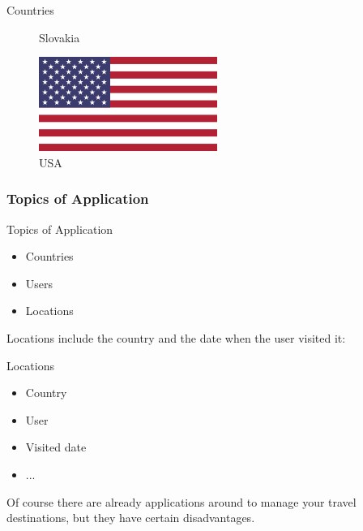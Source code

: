 \begin{frame}{Countries}
\begin{figure}[!ht]
\begin{minipage}{.24\textwidth}
\caption{Slovakia}
\end{minipage}
\begin{minipage}{.24\textwidth}
\centering
\includegraphics[width=0.8\linewidth]{img/countries/usa.png}
\caption{USA}
\end{minipage}

\end{figure}

\end{frame}

\subsubsection{Topics of Application}

\begin{frame}{Topics of Application}
\begin{itemize}
\item Countries
\item Users
\item Locations
\end{itemize}
\end{frame}

Locations include the country and the date when the 
user visited it:

\begin{frame}{Locations}
\begin{itemize}
\item Country
\item User
\item Visited date
\item ...
\end{itemize}
\end{frame}

Of course there are already applications around to manage
your travel destinations, but they have certain disadvantages.


